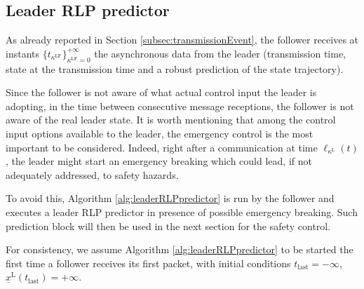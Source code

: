 \documentclass[letterpaper, 10 pt, conference]{ieeeconf}
\theoremstyle{definition}
\theoremstyle{nopoint}
\begin{document}
  
\subsection{Leader RLP predictor}
 \label{subsec:leaderRLPpredictor}

As  already reported in Section \ref{subsec:transmissionEvent}, the follower receives at instants \(\{ t_{\kappa^\mathrm{LF}} \}_{\kappa^\mathrm{LF}=0}^{+\infty}\)
the asynchronous data from the leader (transmission time, state at the transmission time and a robust prediction of the state trajectory). 


Since the follower is not aware of what  actual control input  the leader is adopting, in the time between consecutive message receptions, the follower is not aware of the real leader state. It is worth mentioning that among the control input options available to the leader, the emergency control is the most important to be considered. Indeed, right after a communication at time $\ell_{\kappa^\mathrm{L}}(t)$, the leader might start an emergency breaking which could lead, if not adequately addressed, to safety hazards. 

To avoid this,  Algorithm \ref{alg:leaderRLPpredictor} is run by the follower and executes a leader RLP predictor in presence of possible emergency breaking. Such prediction block will then be used in the next section for the safety control.

For consistency, we assume Algorithm \ref{alg:leaderRLPpredictor} to be started the first time a follower receives its first packet, with initial conditions $t_{\mathrm{last}}=-\infty$, $\underline{x}^\mathrm{L}(t_{\mathrm{last}})=+\infty$.
\end{document}
